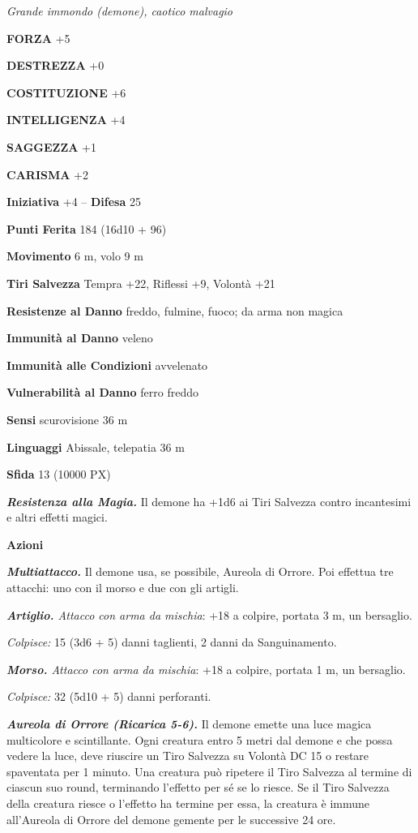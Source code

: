 \begin{multicols}{2}
	\textit{Grande immondo (demone), caotico malvagio}

	\textbf{FORZA} +5

	\textbf{DESTREZZA} +0

	\textbf{COSTITUZIONE} +6

	\textbf{INTELLIGENZA} +4

	\textbf{SAGGEZZA} +1

	\textbf{CARISMA} +2

	\textbf{Iniziativa} +4 -- \textbf{Difesa} 25

	\textbf{Punti Ferita} 184 (16d10 + 96)

	\textbf{Movimento} 6 m, volo 9 m

	\textbf{Tiri Salvezza} Tempra +22, Riflessi +9, Volontà +21

	\textbf{Resistenze al Danno} freddo, fulmine, fuoco; da arma non magica

	\textbf{Immunità al Danno} veleno

	\textbf{Immunità alle Condizioni} avvelenato

	\textbf{Vulnerabilità al Danno} ferro freddo

	\textbf{Sensi} scurovisione 36 m

	\textbf{Linguaggi} Abissale, telepatia 36 m

	\textbf{Sfida} 13 (10000 PX)

	\textit{\textbf{Resistenza alla Magia.}} Il demone ha +1d6 ai Tiri Salvezza contro incantesimi e altri effetti magici.

	\textbf{Azioni}

	\textit{\textbf{Multiattacco.}} Il demone usa, se possibile, Aureola di Orrore. Poi effettua tre attacchi: uno con il morso e due con gli artigli.

	\textit{\textbf{Artiglio.} Attacco con arma da mischia}: +18 a colpire, portata 3 m, un bersaglio.

	\textit{Colpisce:} 15 (3d6 + 5) danni taglienti, 2 danni da Sanguinamento.

	\textit{\textbf{Morso.} Attacco con arma da mischia}: +18 a colpire, portata 1 m, un bersaglio.

	\textit{Colpisce:} 32 (5d10 + 5) danni perforanti.

	\textit{\textbf{Aureola di Orrore (Ricarica 5-6).}} Il demone emette una luce magica multicolore e scintillante. Ogni creatura entro 5 metri dal demone e che possa vedere la luce, deve riuscire un Tiro Salvezza su Volontà DC 15 o restare spaventata per 1 minuto. Una creatura può ripetere il Tiro Salvezza al termine di ciascun suo round, terminando l'effetto per sé se lo riesce. Se il Tiro Salvezza della creatura riesce o l'effetto ha termine per essa, la creatura è immune all'Aureola di
	Orrore del demone gemente per le successive 24 ore.


\end{multicols}
